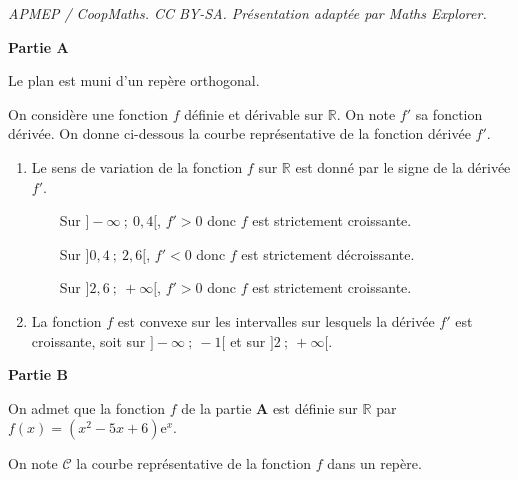 \documentclass[10pt]{article}
\begin{document}
\noindent\textit{APMEP / CoopMaths. CC BY-SA. Présentation adaptée par Maths Explorer.}\par\medskip
\medskip

\textbf{\large Partie A}

\medskip

Le plan est muni d'un repère orthogonal.

On considère une fonction $f$ définie et dérivable sur $\mathbb{R}$. On note $f'$ sa fonction dérivée. On donne ci-dessous la courbe représentative de la fonction dérivée $f'$.

\begin{center}
\end{center}





\begin{enumerate}
\item Le sens de variation de la fonction $f$ sur $\mathbb{R}$ est donné par le signe de la dérivée $f'$.

~~\textbullet~~Sur $]-\infty~;~0,4[$, $f'>0$ donc $f$ est strictement croissante.

~~\textbullet~~Sur $]0,4~;~2,6[$, $f'<0$ donc $f$ est strictement décroissante.

~~\textbullet~~Sur $]2,6~;~+\infty[$, $f'>0$ donc $f$ est strictement croissante.

\item La fonction $f$ est convexe sur les intervalles sur lesquels la dérivée $f'$ est croissante, soit sur $]-\infty~;~-1[$ et sur $]2~;~+\infty[$.
\end{enumerate}

\medskip

\textbf{\large Partie B}

\medskip

On admet que la fonction $f$ de la partie $\mathbf{A}$ est définie sur $\mathbb{R}$ par 
$f(x)=\left(x^{2}- 5 x + 6\right) \mathrm{e}^{x}$.

On note $\mathcal{C}$ la courbe représentative de la fonction $f$ dans un repère.
\end{document}
